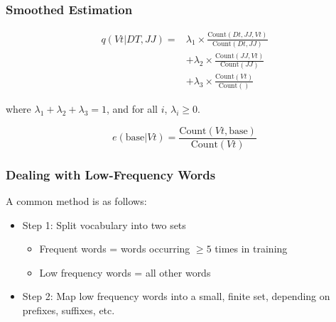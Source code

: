 \documentclass[handout]{beamer}
\begin{document}
\begin{frame}
\frametitle{Smoothed Estimation}

\[
\begin{aligned}
q(Vt | DT, JJ) = & \lambda_1 \times \frac{{\text{Count}(Dt, JJ, Vt)}}{{\text{Count}(Dt, JJ)}} \\
& + \lambda_2 \times \frac{{\text{Count}(JJ, Vt)}}{{\text{Count}(JJ)}} \\
& + \lambda_3 \times \frac{{\text{Count}(Vt)}}{{\text{Count}()}}
\end{aligned}
\]

where $\lambda_1 + \lambda_2 + \lambda_3 = 1$, and for all $i$, $\lambda_i \geq 0$.

\vspace{0.5cm}

\[
e(\text{base} | Vt) = \frac{{\text{Count}(Vt, \text{base})}}{{\text{Count}(Vt)}}
\]

\end{frame}

\begin{frame}
\frametitle{Dealing with Low-Frequency Words}

A common method is as follows:
\begin{itemize}
  \item Step 1: Split vocabulary into two sets
    \begin{itemize}
      \item Frequent words = words occurring $\geq 5$ times in training
      \item Low frequency words = all other words
    \end{itemize}
  \item Step 2: Map low frequency words into a small, finite set, depending on prefixes, suffixes, etc.
\end{itemize}

\end{frame}
\end{document}
